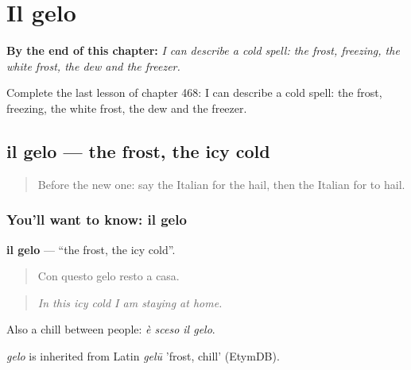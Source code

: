 
\chapter{Il gelo}
\label{ch:it-il-gelo}

\begin{chapteropening}
\textbf{By the end of this chapter:} \emph{I can describe a cold spell: the frost, freezing, the white frost, the dew and the freezer.}

Complete the last lesson of chapter 468: I can describe a cold spell: the frost, freezing, the white frost, the dew and the freezer.
\end{chapteropening}

\section[il gelo]{il gelo — the frost, the icy cold}

\label{lesson:IT-C468-gelo}



\begin{quote}
Before the new one: say the Italian for the hail, then the Italian for to hail.
\end{quote}

\subsection*{You'll want to know: il gelo}
\textbf{il gelo} — \textquotedblleft{}the frost, the icy cold\textquotedblright{}.

\begin{quote}
Con questo gelo resto a casa.
\end{quote}

\begin{quote}
\emph{In this icy cold I am staying at home.}
\end{quote}

Also a chill between people: \emph{è sceso il gelo}.

\begin{cousinweb}
\emph{gelo} is inherited from Latin \emph{gelū} 'frost, chill' (EtymDB).
\end{cousinweb}

